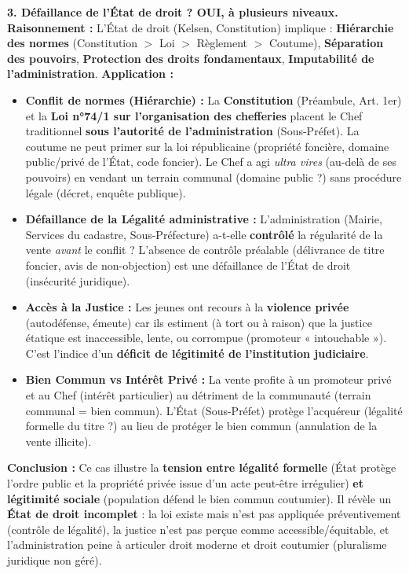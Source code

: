 \documentclass[11pt]{article}
\begin{document}
\begin{exoresolu}
\textbf{3. Défaillance de l'État de droit ? OUI, à plusieurs niveaux.}
\textbf{Raisonnement :} L'État de droit (Kelsen, Constitution) implique : \textbf{Hiérarchie des normes} (Constitution $>$ Loi $>$ Règlement $>$ Coutume), \textbf{Séparation des pouvoirs}, \textbf{Protection des droits fondamentaux}, \textbf{Imputabilité de l'administration}.
\textbf{Application :}
\begin{itemize}
    \item \textbf{Conflit de normes (Hiérarchie) :} La \textbf{Constitution} (Préambule, Art. 1er) et la \textbf{Loi n°74/1 sur l'organisation des chefferies} placent le Chef traditionnel \textbf{sous l'autorité de l'administration} (Sous-Préfet). La coutume ne peut primer sur la loi républicaine (propriété foncière, domaine public/privé de l'État, code foncier). Le Chef a agi \emph{ultra vires} (au-delà de ses pouvoirs) en vendant un terrain communal (domaine public ?) sans procédure légale (décret, enquête publique).
    \item \textbf{Défaillance de la Légalité administrative :} L'administration (Mairie, Services du cadastre, Sous-Préfecture) a-t-elle \textbf{contrôlé} la régularité de la vente \emph{avant} le conflit ? L'absence de contrôle préalable (délivrance de titre foncier, avis de non-objection) est une défaillance de l'État de droit (insécurité juridique).
    \item \textbf{Accès à la Justice :} Les jeunes ont recours à la \textbf{violence privée} (autodéfense, émeute) car ils estiment (à tort ou à raison) que la justice étatique est inaccessible, lente, ou corrompue (promoteur « intouchable »). C'est l'indice d'un \textbf{déficit de légitimité de l'institution judiciaire}.
    \item \textbf{Bien Commun vs Intérêt Privé :} La vente profite à un promoteur privé et au Chef (intérêt particulier) au détriment de la communauté (terrain communal = bien commun). L'État (Sous-Préfet) protège l'acquéreur (légalité formelle du titre ?) au lieu de protéger le bien commun (annulation de la vente illicite).
\end{itemize}
\textbf{Conclusion :} Ce cas illustre la \textbf{tension entre légalité formelle} (État protège l'ordre public et la propriété privée issue d'un acte peut-être irrégulier) \textbf{et légitimité sociale} (population défend le bien commun coutumier). Il révèle un \textbf{État de droit incomplet} : la loi existe mais n'est pas appliquée préventivement (contrôle de légalité), la justice n'est pas perçue comme accessible/équitable, et l'administration peine à articuler droit moderne et droit coutumier (pluralisme juridique non géré).
\end{exoresolu}
\end{document}
